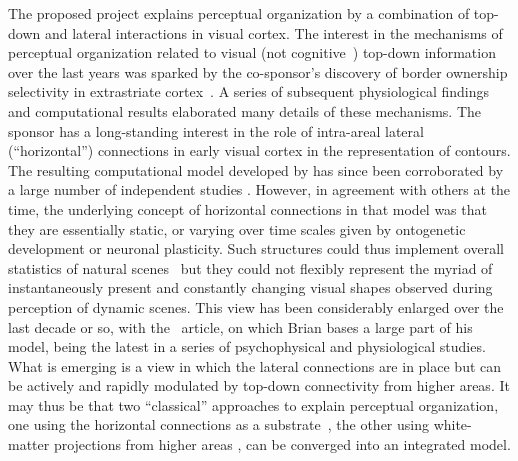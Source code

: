 The proposed project explains perceptual organization by a combination
of top-down and lateral interactions in visual cortex. The interest in the mechanisms of perceptual organization related to visual (not cognitive~) top-down information over the last years was sparked by
the co-sponsor's discovery of border ownership selectivity in extrastriate cortex~\citep{Zhou_etal00}. A series of subsequent physiological findings \citep{vonderHeydt_etal00a,vonderHeydt_etal03b,Qiu_vonderHeydt05,vonderHeydt_etal05,vonderHeydt_Pierson06,Qiu_vonderHeydt07,Qiu_etal07,OHerron_vonderHeydt09,
  Zhang_vonderHeydt10,Sugihara_etal11,OHerron_vonderHeydt13} and
computational results \citep{Dong_etal08a,Craft_etal07,Mihalas_etal11b,Ardila_etal12,Russell_etal14} elaborated many details of these mechanisms.  The sponsor has a
long-standing interest in the role of intra-areal lateral (``horizontal'') connections in early visual cortex in the representation of contours. The resulting computational model developed by \citet{Stemmler_etal95b} has since been corroborated by a large number of independent studies
\citep[e.g.][]{Simonotto_etal97,Polat_etal98,Chatterjee_etal11,Xie_etal14}. However, in agreement with others at the time, the underlying concept of horizontal connections in that model was that they are essentially static, or varying over time scales given by ontogenetic development or neuronal plasticity. Such structures could thus implement overall statistics of natural scenes~\citep[like circular structures, e.g.][]{Sigman_etal01} but they could not flexibly represent the myriad of instantaneously present and constantly changing visual shapes observed during perception of dynamic scenes. This view has been considerably enlarged over the last decade or so, with the~\citet{Chen_etal14} article, on which Brian bases a large part of his model, being the latest in a series of psychophysical and physiological studies. What is emerging is a view in which the lateral connections are in place but can be actively and rapidly modulated by top-down connectivity from higher areas. It may thus be that two ``classical'' approaches to explain perceptual organization, one using the horizontal connections as a substrate~\citep[e.g.][]{Zhaoping05, Piech_etal13}, the other using white-matter projections from higher areas \citep[e.g.][]{Craft_etal07,Mihalas_etal11b}, can be converged into an integrated model.

